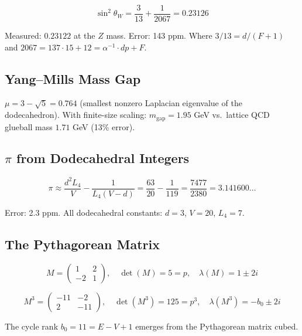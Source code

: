 \documentclass[12pt,a4paper]{article}
\begin{document}
\begin{equation}
\sin^2\theta_W = \frac{3}{13} + \frac{1}{2067} = 0.23126
\end{equation}

Measured: $0.23122$ at the $Z$ mass. Error: 143 ppm. Where $3/13 = d/(F+1)$ and $2067 = 137 \cdot 15 + 12 = \alpha^{-1} \cdot dp + F$.

\subsection{Yang--Mills Mass Gap}

$\mu = 3 - \sqrt{5} = 0.764$ (smallest nonzero Laplacian eigenvalue of the dodecahedron). With finite-size scaling: $m_{\mathrm{gap}} = 1.95$ GeV vs.\ lattice QCD glueball mass $1.71$ GeV (13\% error).

\subsection{$\pi$ from Dodecahedral Integers}

\begin{equation}
\pi \approx \frac{d^2 L_4}{V} - \frac{1}{L_4(V-d)} = \frac{63}{20} - \frac{1}{119} = \frac{7477}{2380} = 3.141600\ldots
\end{equation}

Error: 2.3 ppm. All dodecahedral constants: $d=3$, $V=20$, $L_4=7$.

\subsection{The Pythagorean Matrix}

\begin{equation}
M = \begin{pmatrix} 1 & 2 \\ -2 & 1 \end{pmatrix}, \quad \det(M) = 5 = p, \quad \lambda(M) = 1 \pm 2i
\end{equation}

\begin{equation}
M^3 = \begin{pmatrix} -11 & -2 \\ 2 & -11 \end{pmatrix}, \quad \det(M^3) = 125 = p^3, \quad \lambda(M^3) = -b_0 \pm 2i
\end{equation}

The cycle rank $b_0 = 11 = E-V+1$ emerges from the Pythagorean matrix cubed.
\end{document}
